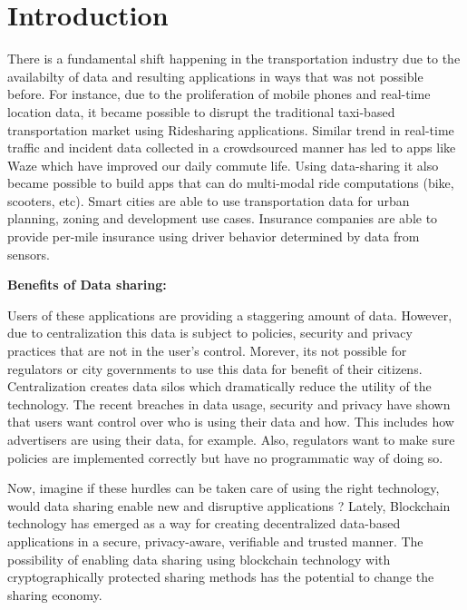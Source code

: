 \noindent
\section{Introduction}\label{sec:intro}

There is a fundamental shift happening in the transportation industry due to the availabilty of data and resulting
applications in ways that was not possible before. For instance, due to the proliferation of mobile phones and real-time
location data, it became possible to disrupt the traditional taxi-based transportation market using Ridesharing
applications. Similar trend in real-time traffic and incident data collected in a crowdsourced manner has led to apps
like Waze which have improved our daily commute life. Using data-sharing it also became possible to build apps that can
do multi-modal ride computations (bike, scooters, etc). Smart cities are able to use transportation data for
urban planning, zoning and development use cases. Insurance companies are able to provide per-mile insurance using
driver behavior determined by data from sensors.

\noindent
{\bf Benefits of Data sharing:}


Users of these applications are providing a staggering amount of data. However, due to centralization this data is
subject to policies, security and privacy practices that are not in the user's control. Morever, its not possible for
regulators or city governments to use this data for benefit of their citizens. Centralization creates data silos which
dramatically reduce the utility of the technology. The recent breaches in data usage, security and privacy have shown
that users want control over who is using their data and how. This includes how advertisers are using their data, for
example. Also, regulators want to make sure policies are implemented correctly but have no programmatic way of doing so.

Now, imagine if these hurdles can be taken care of using the right technology, would data sharing enable new and
disruptive applications ? Lately, Blockchain technology has emerged as a way for creating decentralized data-based
applications in a secure, privacy-aware, verifiable and trusted manner. The possibility of enabling data sharing using
blockchain technology with cryptographically protected sharing methods has the potential to change the sharing economy.

